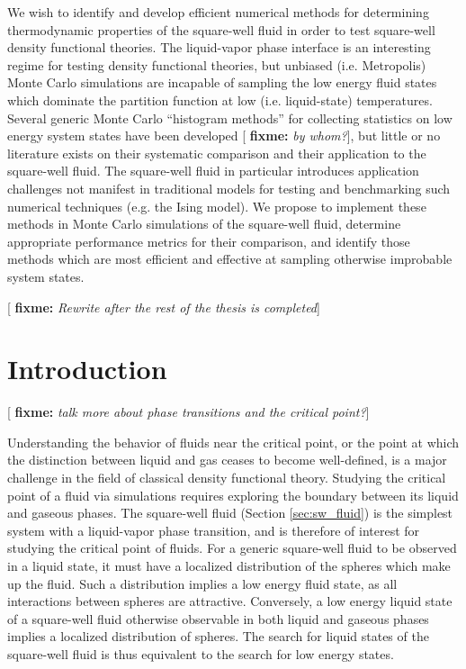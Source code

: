 \documentclass[11pt]{article}
\newcommand{\red}[1]{{\bf \color{red} #1}}
\newcommand{\fixme}[1]{[\red{fixme:} \emph{#1}]}
\begin{document}
\thispagestyle{abstract}

We wish to identify and develop efficient numerical methods for
determining thermodynamic properties of the square-well fluid in order
to test square-well density functional theories. The liquid-vapor
phase interface is an interesting regime for testing density
functional theories, but unbiased (i.e. Metropolis) Monte Carlo
simulations are incapable of sampling the low energy fluid states
which dominate the partition function at low (i.e. liquid-state)
temperatures. Several generic Monte Carlo ``histogram methods'' for
collecting statistics on low energy system states have been developed
\fixme{by whom?}, but little or no literature exists on their
systematic comparison and their application to the square-well
fluid. The square-well fluid in particular introduces application
challenges not manifest in traditional models for testing and
benchmarking such numerical techniques (e.g. the Ising model). We
propose to implement these methods in Monte Carlo simulations of the
square-well fluid, determine appropriate performance metrics for their
comparison, and identify those methods which are most efficient and
effective at sampling otherwise improbable system states.

\fixme{Rewrite after the rest of the thesis is completed}

\newpage


\section{Introduction}
\label{sec:intro}

\fixme{talk more about phase transitions and the critical point?}

Understanding the behavior of fluids near the critical point, or the
point at which the distinction between liquid and gas ceases to become
well-defined, is a major challenge in the field of classical density
functional theory. Studying the critical point of a fluid via
simulations requires exploring the boundary between its liquid and
gaseous phases. The square-well fluid (Section \ref{sec:sw_fluid}) is
the simplest system with a liquid-vapor phase transition, and is
therefore of interest for studying the critical point of fluids. For a
generic square-well fluid to be observed in a liquid state, it must
have a localized distribution of the spheres which make up the
fluid. Such a distribution implies a low energy fluid state, as all
interactions between spheres are attractive. Conversely, a low energy
liquid state of a square-well fluid otherwise observable in both
liquid and gaseous phases implies a localized distribution of
spheres. The search for liquid states of the square-well fluid is thus
equivalent to the search for low energy states.
\end{document}

